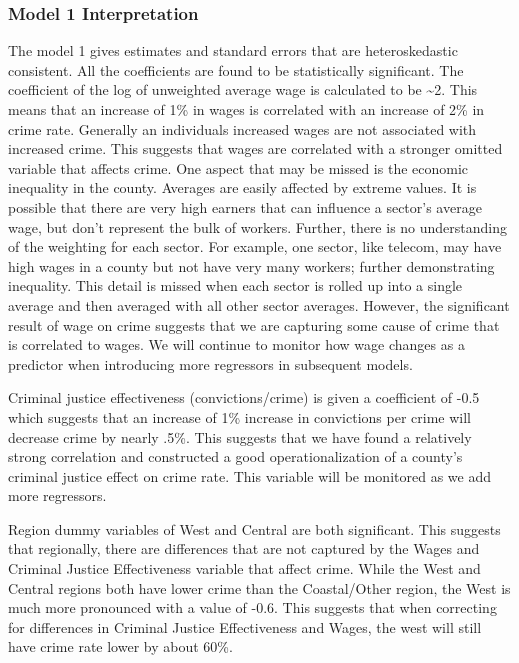 \documentclass[]{article}
\begin{document}
\hypertarget{model-1-interpretation}{%
\subsubsection{Model 1 Interpretation}\label{model-1-interpretation}}

The model 1 gives estimates and standard errors that are heteroskedastic
consistent. All the coefficients are found to be statistically
significant. The coefficient of the log of unweighted average wage is
calculated to be \textasciitilde{}2. This means that an increase of 1\%
in wages is correlated with an increase of 2\% in crime rate. Generally
an individuals increased wages are not associated with increased crime.
This suggests that wages are correlated with a stronger omitted variable
that affects crime. One aspect that may be missed is the economic
inequality in the county. Averages are easily affected by extreme
values. It is possible that there are very high earners that can
influence a sector's average wage, but don't represent the bulk of
workers. Further, there is no understanding of the weighting for each
sector. For example, one sector, like telecom, may have high wages in a
county but not have very many workers; further demonstrating inequality.
This detail is missed when each sector is rolled up into a single
average and then averaged with all other sector averages. However, the
significant result of wage on crime suggests that we are capturing some
cause of crime that is correlated to wages. We will continue to monitor
how wage changes as a predictor when introducing more regressors in
subsequent models.

Criminal justice effectiveness (convictions/crime) is given a
coefficient of -0.5 which suggests that an increase of 1\% increase in
convictions per crime will decrease crime by nearly .5\%. This suggests
that we have found a relatively strong correlation and constructed a
good operationalization of a county's criminal justice effect on crime
rate. This variable will be monitored as we add more regressors.

Region dummy variables of West and Central are both significant. This
suggests that regionally, there are differences that are not captured by
the Wages and Criminal Justice Effectiveness variable that affect crime.
While the West and Central regions both have lower crime than the
Coastal/Other region, the West is much more pronounced with a value of
-0.6. This suggests that when correcting for differences in Criminal
Justice Effectiveness and Wages, the west will still have crime rate
lower by about 60\%.
\end{document}

